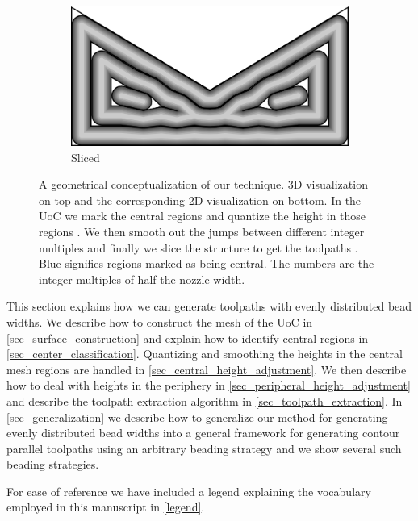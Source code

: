 \begin{figure}
\begin{subfigure}{\figwidth}
\includegraphics[width=\figwidthTwo]{sources/method/surface/sliced_2D.png}
\caption{Sliced}\label{3d_surface_overview_sliced}
\end{subfigure}
\caption{
A geometrical conceptualization of our technique.
3D visualization on top and the corresponding 2D visualization on bottom.
In the UoC 
we mark the central regions 
and quantize the height in those regions .
We then smooth out the jumps between different integer multiples 
and finally we slice the structure to get the toolpaths .
Blue signifies regions marked as being central.
The numbers are the integer multiples of half the nozzle width.
}
\label{3d_surface_overview}
\end{figure}

This section explains how we can generate toolpaths with evenly distributed bead widths.
We describe how to construct the mesh of the UoC in \cref{sec_surface_construction} and
explain how to identify central regions in \cref{sec_center_classification}.
Quantizing and smoothing the heights in the central mesh regions are handled in \cref{sec_central_height_adjustment}.
We then describe how to deal with heights in the periphery in \cref{sec_peripheral_height_adjustment}
and describe the toolpath extraction algorithm in \cref{sec_toolpath_extraction}.
In \cref{sec_generalization} we describe how to generalize our method for generating evenly distributed bead widths into a general framework for generating contour parallel toolpaths using an arbitrary beading strategy and we show several such beading strategies.


For ease of reference we have included a legend explaining the vocabulary employed in this manuscript in \cref{legend}.

